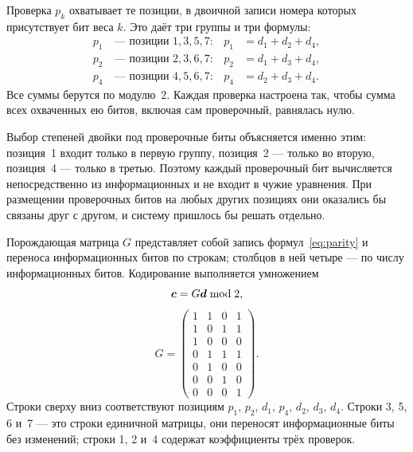 \documentclass[a4paper,14pt]{extarticle}
\begin{document}
Проверка $p_k$ охватывает те позиции, в двоичной записи номера которых присутствует
бит веса $k$. Это даёт три группы и три формулы:
\begin{equation}
\begin{aligned}
  p_1 &\ \text{--- позиции } 1,3,5,7: & p_1 &= d_1 + d_2 + d_4, \\
  p_2 &\ \text{--- позиции } 2,3,6,7: & p_2 &= d_1 + d_3 + d_4, \\
  p_4 &\ \text{--- позиции } 4,5,6,7: & p_4 &= d_2 + d_3 + d_4 .
\end{aligned}
\label{eq:parity}
\end{equation}
Все суммы берутся по модулю~2. Каждая проверка настроена так, чтобы сумма всех
охваченных ею битов, включая сам проверочный, равнялась нулю.

Выбор степеней двойки под проверочные биты объясняется именно этим: позиция~1 входит
только в первую группу, позиция~2 --- только во вторую, позиция~4 --- только в третью.
Поэтому каждый проверочный бит вычисляется непосредственно из информационных и не
входит в чужие уравнения. При размещении проверочных битов на любых других позициях
они оказались бы связаны друг с другом, и систему пришлось бы решать отдельно.

Порождающая матрица $G$ представляет собой запись формул~\eqref{eq:parity} и
переноса информационных битов по строкам; столбцов в ней четыре --- по числу
информационных битов. Кодирование выполняется умножением
\begin{equation}
  \boldsymbol{c} = G\boldsymbol{d} \bmod 2 ,
  \label{eq:henc}
\end{equation}
\begin{equation}
  G = \begin{pmatrix} 1&1&0&1 \\ 1&0&1&1 \\ 1&0&0&0 \\ 0&1&1&1 \\ 0&1&0&0 \\ 0&0&1&0 \\ 0&0&0&1 \end{pmatrix}.
  \label{eq:G}
\end{equation}
Строки сверху вниз соответствуют позициям $p_1$, $p_2$, $d_1$, $p_4$, $d_2$, $d_3$,
$d_4$. Строки 3, 5, 6 и~7 --- это строки единичной матрицы, они переносят
информационные биты без изменений; строки 1, 2 и~4 содержат коэффициенты трёх
проверок.
\end{document}

